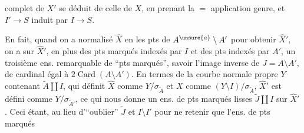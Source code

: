 complet de $X'$ se déduit de celle de $X$, en prenant la $=$ application genre, et $I'\longrightarrow S$ induit par $I\longrightarrow S$.

En fait, quand on a normalisé $\widehat X$ en les pts de $A^{\unsure{a}}\setminus A'$ pour obtenir $\widehat X'$, on a sur $\widehat X'$, en plus des pts marqués indexés par $I$ et des pts  indexés par $A'$, un troisième ens. remarquable de ``pts marqués'', savoir l'image inverse  de $J=A\setminus A'$,  de cardinal égal à $2\operatorname{Card}(A\setminus A')$. En termes de la courbe normale propre $Y$  contenant $\widetilde A\amalg I$, qui définit $\widehat X$ comme $Y/\sigma_{\widetilde A}$ et $X$ comme $(Y\setminus I)/\sigma_{\widetilde A}$, $\widehat X'$ est défini comme $Y/\sigma_{\widetilde A'}$, ce qui nous donne un ens. de pts marqués lisses  $\widetilde J\amalg I$ sur $\widehat X'$. Ceci étant, au lieu d'``oublier'' $\widetilde J$ et $I\setminus I'$ pour ne retenir que l'ens. de pts marqués
